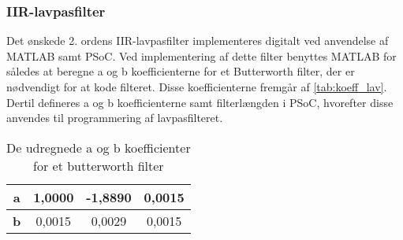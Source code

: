 \subsubsection{IIR-lavpasfilter}
Det ønskede 2. ordens IIR-lavpasfilter implementeres digitalt ved anvendelse af MATLAB samt PSoC.
Ved implementering af dette filter benyttes MATLAB for således at beregne a og b koefficienterne for et Butterworth filter, der er nødvendigt for at kode filteret. Disse koefficienterne fremgår af \autoref{tab:koeff_lav}. Dertil defineres a og b koefficienterne samt filterlængden i PSoC, hvorefter disse anvendes til programmering af lavpasfilteret. 

\begin{table}[H]
\centering
\begin{tabular}{|c|c|c|c|}
\hline
\textbf{a} & 1,0000 & -1,8890 & 0,0015 \\ \hline
\textbf{b} & 0,0015 & 0,0029  & 0,0015 \\ \hline
\end{tabular}
\caption{De udregnede a og b koefficienter for et butterworth filter}
\label{tab:koeff_lav}
\end{table}